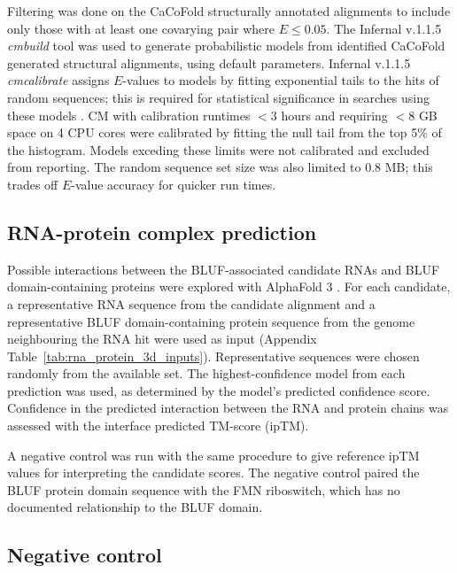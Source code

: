 Filtering was done on the CaCoFold structurally annotated alignments to include only those with at least one covarying pair where $E \le 0.05$.
The Infernal v.1.1.5 \emph{cmbuild} tool was used to generate probabilistic models from identified CaCoFold generated structural alignments, using default parameters.
Infernal v.1.1.5 \emph{cmcalibrate} assigns $E$-values to models by fitting exponential tails to the hits of random sequences; this is required for statistical significance in searches using these models \citep{Nawrocki2013}.
\ac{CM} with calibration runtimes $< 3$ hours and requiring $< 8$ \ac{GB} space on 4 \ac{CPU} cores were calibrated by fitting the null tail from the top 5\% of the histogram.
Models exceding these limits were not calibrated and excluded from reporting.
The random sequence set size was also limited to 0.8 \ac{MB}; this trades off $E$-value accuracy for quicker run times.

\subsection{RNA-protein complex prediction}
\label{sec:alphafold}

Possible interactions between the \ac{BLUF}-associated candidate RNAs and \ac{BLUF} domain-containing proteins were explored with AlphaFold 3 \citep{Abramson2024}.
For each candidate, a representative RNA sequence from the candidate alignment and a representative \ac{BLUF} domain-containing protein sequence from the genome neighbouring the RNA hit were used as input (Appendix Table~\ref{tab:rna_protein_3d_inputs}).
Representative sequences were chosen randomly from the available set.
The highest-confidence model from each prediction was used, as determined by the model's predicted confidence score.
Confidence in the predicted interaction between the RNA and protein chains was assessed with the interface predicted TM-score (\ac{ipTM}).

A negative control was run with the same procedure to give reference \ac{ipTM} values for interpreting the candidate scores.
The negative control paired the \ac{BLUF} protein domain sequence with the \ac{FMN} riboswitch, which has no documented relationship to the \ac{BLUF} domain.

\subsection{Negative control}
\label{sec:negative-control}

